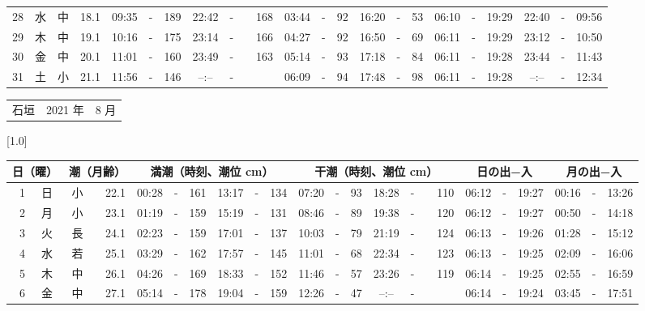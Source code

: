 \documentclass[12pt,a4j]{jsarticle}
\begin{document}
\begin{table}[htbp]
\begin{center}
{\begin{tabular}{|rc|cr|ccrccr|ccrccr|ccc|ccc|}
28 & 水 & 中 & 18.1 &  09:35 &-& 189 &  22:42 &-& 168 &  03:44 &-&  92 &  16:20 &-&  53 & 06:10 & -& 19:29 & 22:40 & -& 09:56 \\
29 & 木 & 中 & 19.1 &  10:16 &-& 175 &  23:14 &-& 166 &  04:27 &-&  92 &  16:50 &-&  69 & 06:11 & -& 19:29 & 23:12 & -& 10:50 \\
30 & 金 & 中 & 20.1 &  11:01 &-& 160 &  23:49 &-& 163 &  05:14 &-&  93 &  17:18 &-&  84 & 06:11 & -& 19:28 & 23:44 & -& 11:43 \\
31 & 土 & 小 & 21.1 &  11:56 &-& 146 &  --:-- &-&~~~~~ &  06:09 &-&  94 &  17:48 &-&  98 & 06:11 & -& 19:28 & --:-- & -& 12:34 \\
   \hline
   \end{tabular}}
   \end{center}
\end{table}
\newpage
 \begin{table}[htbp]
 \begin{center}
 \begin{tabular}{lcc}
 \LARGE{石垣}  & \large{2021 年} & \large{ 8 月} \\
 \end{tabular}
 \end{center}
 \begin{center}
    \scalebox{0.7}[1.0]{
    \begin{tabular}{|rc|cr|ccrccr|ccrccr|ccc|ccc|}
    \hline
    \multicolumn{2}{|c|}{日（曜）} & \multicolumn{2}{c|}{潮（月齢）} & \multicolumn{6}{c|}{満潮（時刻、潮位 cm）} & \multicolumn{6}{c|}{干潮（時刻、潮位 cm）} & \multicolumn{3}{c|}{日の出−入} &  \multicolumn{3}{c|}{月の出−入}\\
 \hline
 1 & 日 & 小 & 22.1 &  00:28 &-& 161 &  13:17 &-& 134 &  07:20 &-&  93 &  18:28 &-& 110 & 06:12 & -& 19:27 & 00:16 & -& 13:26 \\
 2 & 月 & 小 & 23.1 &  01:19 &-& 159 &  15:19 &-& 131 &  08:46 &-&  89 &  19:38 &-& 120 & 06:12 & -& 19:27 & 00:50 & -& 14:18 \\
 3 & 火 & 長 & 24.1 &  02:23 &-& 159 &  17:01 &-& 137 &  10:03 &-&  79 &  21:19 &-& 124 & 06:13 & -& 19:26 & 01:28 & -& 15:12 \\
 4 & 水 & 若 & 25.1 &  03:29 &-& 162 &  17:57 &-& 145 &  11:01 &-&  68 &  22:34 &-& 123 & 06:13 & -& 19:25 & 02:09 & -& 16:06 \\
 5 & 木 & 中 & 26.1 &  04:26 &-& 169 &  18:33 &-& 152 &  11:46 &-&  57 &  23:26 &-& 119 & 06:14 & -& 19:25 & 02:55 & -& 16:59 \\
 6 & 金 & 中 & 27.1 &  05:14 &-& 178 &  19:04 &-& 159 &  12:26 &-&  47 &  --:-- &-&~~~~~ & 06:14 & -& 19:24 & 03:45 & -& 17:51 \\

\end{tabular}}
\end{center}
\end{table}
\end{document}
